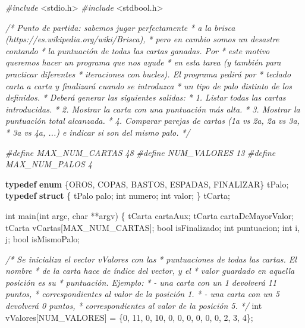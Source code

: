 \documentclass[
]{book}
\newenvironment{Shaded}{\begin{snugshade}}{\end{snugshade}}
\newcommand{\CommentTok}[1]{\textcolor[rgb]{0.56,0.35,0.01}{\textit{#1}}}
\newcommand{\DataTypeTok}[1]{\textcolor[rgb]{0.13,0.29,0.53}{#1}}
\newcommand{\DecValTok}[1]{\textcolor[rgb]{0.00,0.00,0.81}{#1}}
\newcommand{\ImportTok}[1]{#1}
\newcommand{\KeywordTok}[1]{\textcolor[rgb]{0.13,0.29,0.53}{\textbf{#1}}}
\newcommand{\NormalTok}[1]{#1}
\newcommand{\PreprocessorTok}[1]{\textcolor[rgb]{0.56,0.35,0.01}{\textit{#1}}}
\begin{document}
\begin{Shaded}
\begin{Highlighting}[]
\PreprocessorTok{\#include }\ImportTok{\textless{}stdio.h\textgreater{}}
\PreprocessorTok{\#include }\ImportTok{\textless{}stdbool.h\textgreater{}}

\CommentTok{/* Punto de partida: sabemos jugar perfectamente}
\CommentTok{ * a la brisca (https://es.wikipedia.org/wiki/Brisca),}
\CommentTok{ * pero en cambio somos un desastre contando}
\CommentTok{ * la puntuación de todas las cartas ganadas. Por}
\CommentTok{ * este motivo queremos hacer un programa que nos ayude}
\CommentTok{ * en esta tarea (y también para practicar diferentes}
\CommentTok{ * iteraciones con bucles). El programa pedirá por}
\CommentTok{ * teclado carta a carta y finalizará cuando se introduzca}
\CommentTok{ * un tipo de palo distinto de los definidos.}
\CommentTok{ * Deberá generar las siguientes salidas:}
\CommentTok{ * 1. Listar todas las cartas introducidas.}
\CommentTok{ * 2. Mostrar la carta con una puntuación más alta.}
\CommentTok{ * 3. Mostrar la puntuación total alcanzada.}
\CommentTok{ * 4. Comparar parejas de cartas (1a vs 2a, 2a vs 3a,}
\CommentTok{ * 3a vs 4a, ...) e indicar si son del mismo palo.}
\CommentTok{ */}

\PreprocessorTok{\#define MAX\_NUM\_CARTAS 48}
\PreprocessorTok{\#define NUM\_VALORES 13}
\PreprocessorTok{\#define MAX\_NUM\_PALOS 4}

\KeywordTok{typedef} \KeywordTok{enum}\NormalTok{ \{OROS, COPAS, BASTOS, ESPADAS, FINALIZAR\} tPalo;}
\KeywordTok{typedef} \KeywordTok{struct}\NormalTok{ \{}
\NormalTok{    tPalo palo;}
    \DataTypeTok{int}\NormalTok{ numero;}
    \DataTypeTok{int}\NormalTok{ valor;}
\NormalTok{\} tCarta;}

\DataTypeTok{int}\NormalTok{ main(}\DataTypeTok{int}\NormalTok{ argc, }\DataTypeTok{char}\NormalTok{ **argv) \{}
\NormalTok{    tCarta cartaAux;}
\NormalTok{    tCarta cartaDeMayorValor;}
\NormalTok{    tCarta vCartas[MAX\_NUM\_CARTAS];}
    \DataTypeTok{bool}\NormalTok{ isFinalizado;}
    \DataTypeTok{int}\NormalTok{ puntuacion;}
    \DataTypeTok{int}\NormalTok{ i, j;}
    \DataTypeTok{bool}\NormalTok{ isMismoPalo;}
    
    \CommentTok{/* Se inicializa el vector vValores con las}
\CommentTok{     * puntuaciones de todas las cartas. El nombre}
\CommentTok{     * de la carta hace de índice del vector, y el}
\CommentTok{     * valor guardado en aquella posición es su}
\CommentTok{     * puntuación. Ejemplo:}
\CommentTok{     * {-} una carta con un 1 devolverá 11 puntos,}
\CommentTok{     * correspondientes al valor de la posición 1.}
\CommentTok{     * {-} una carta con un 5 devolverá 0 puntos,}
\CommentTok{     * correspondientes al valor de la posición 5.}
\CommentTok{     */}
    \DataTypeTok{int}\NormalTok{ vValores[NUM\_VALORES] = \{}\DecValTok{0}\NormalTok{, }\DecValTok{11}\NormalTok{, }\DecValTok{0}\NormalTok{, }\DecValTok{10}\NormalTok{, }\DecValTok{0}\NormalTok{, }\DecValTok{0}\NormalTok{, }\DecValTok{0}\NormalTok{, }\DecValTok{0}\NormalTok{, }\DecValTok{0}\NormalTok{, }\DecValTok{0}\NormalTok{, }\DecValTok{2}\NormalTok{, }\DecValTok{3}\NormalTok{, }\DecValTok{4}\NormalTok{\};}


\end{Highlighting}
\end{Shaded}
\end{document}
